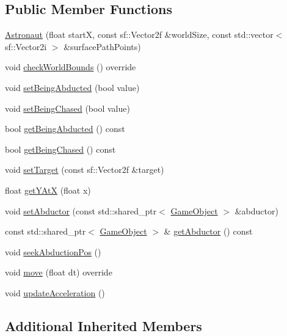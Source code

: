 \subsection*{Public Member Functions}
\begin{DoxyCompactItemize}
\item 
\hyperlink{class_astronaut_a36a970b94e407cb7894f6ae2d3547449}{Astronaut} (float startX, const sf\+::\+Vector2f \&world\+Size, const std\+::vector$<$ sf\+::\+Vector2i $>$ \&surface\+Path\+Points)
\item 
void \hyperlink{class_astronaut_a362cf11f645801a8067efaa1f9310e4c}{check\+World\+Bounds} () override
\item 
void \hyperlink{class_astronaut_a8ca3c9ed488fe685374247cc7e234d81}{set\+Being\+Abducted} (bool value)
\item 
void \hyperlink{class_astronaut_aab8db8ea9ed7d4bf0c594a911f276ce5}{set\+Being\+Chased} (bool value)
\item 
bool \hyperlink{class_astronaut_af372531d99d29adf03595c0a7922ce42}{get\+Being\+Abducted} () const
\item 
bool \hyperlink{class_astronaut_a261c75322690f57c19f46b1fa714c2e0}{get\+Being\+Chased} () const
\item 
void \hyperlink{class_astronaut_ab299cd77fd739b597a9d0f97dce79fe5}{set\+Target} (const sf\+::\+Vector2f \&target)
\item 
float \hyperlink{class_astronaut_accf210f01ffc0bbeaa3b3a9c0004233f}{get\+Y\+AtX} (float x)
\item 
void \hyperlink{class_astronaut_a78272dce915584767db158d231af27d7}{set\+Abductor} (const std\+::shared\+\_\+ptr$<$ \hyperlink{class_game_object}{Game\+Object} $>$ \&abductor)
\item 
const std\+::shared\+\_\+ptr$<$ \hyperlink{class_game_object}{Game\+Object} $>$ \& \hyperlink{class_astronaut_ac09116dc65723515d6bcf4bd81a8fcb2}{get\+Abductor} () const
\item 
void \hyperlink{class_astronaut_aa9f03535d8f48b807838d28885904e59}{seek\+Abduction\+Pos} ()
\item 
void \hyperlink{class_astronaut_a763eea389d50440a049cd16d92c7c694}{move} (float dt) override
\item 
void \hyperlink{class_astronaut_a1f4a85a0c38a73e1370528039535712b}{update\+Acceleration} ()
\end{DoxyCompactItemize}
\subsection*{Additional Inherited Members}



